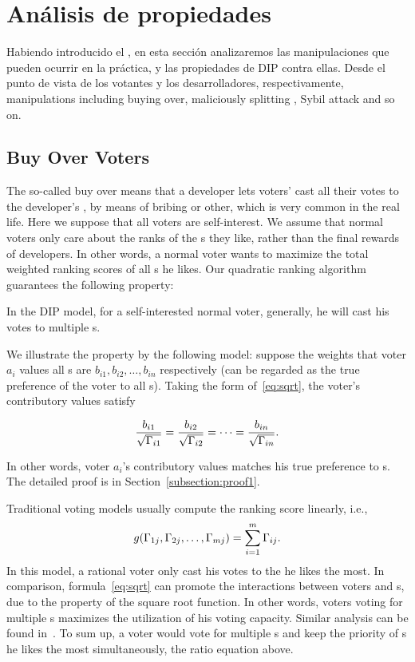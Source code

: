 \section{Análisis de propiedades}
\label{section:properties}
\noindent Habiendo introducido el \pidc, en esta sección analizaremos las manipulaciones que pueden ocurrir en la práctica, y las propiedades de DIP contra ellas\@. Desde el punto de vista de los votantes y los desarrolladores, respectivamente, manipulations including buying over, maliciously splitting \dapp, Sybil attack and so on.
\subsection{Buy Over Voters}
\noindent The so-called buy over means that a developer lets voters' cast all their votes to the developer's \dapp, by means of bribing or other, which is very common in the real life. Here we suppose that all voters are self-interest. We assume that normal voters only care about the ranks of the {\dapp}s they like, rather than the final rewards of developers. In other words, a normal voter wants to maximize the total
weighted ranking scores of all {\dapp}s he likes. Our quadratic ranking algorithm guarantees the following property:

\begin{property}
	\label{p1}
	In the DIP model, for a self-interested normal voter, generally, he will cast his votes to multiple {\dapp}s.
\end{property}
We illustrate the property by the following model: suppose the weights that
voter $a_i$ values all {\dapp}s are $b_{i1}, b_{i2}, \ldots, b_{in}$ respectively (can be regarded as the true preference of the voter to all {\dapp}s). Taking the form of~\ref{eq:sqrt}, the voter's contributory values satisfy

$$\frac{b_{i1}}{\sqrt{\Gamma_{i1}}}=\frac{b_{i2}}{\sqrt{\Gamma_{i2}}}=\cdots=\frac{b_{in}}{\sqrt{\Gamma_{in}}}.$$

In other words, voter $a_i$'s contributory values matches his true preference to {\dapp}s. The detailed proof is in Section~\ref{subsection:proof1}.

Traditional voting models usually compute the ranking score linearly, i.e.,
$$g(\Gamma_{1j},\Gamma_{2j},\ldots,\Gamma_{mj}) = \sum_{i=1}^m \Gamma_{ij}.$$
In this model, a rational voter only cast his votes to the \dapp he likes the
most. In comparison, formula~\ref{eq:sqrt} can promote the interactions between
voters and {\dapp}s, due to the property of the square root function. In other
words, voters voting for multiple {\dapp}s maximizes the utilization of his voting
capacity. Similar analysis can be found in~\cite{buterin2018liberal}. To sum up,
a voter would vote for multiple {\dapp}s and keep the priority of {\dapp}s he likes
the most simultaneously, \ie the ratio equation above.

